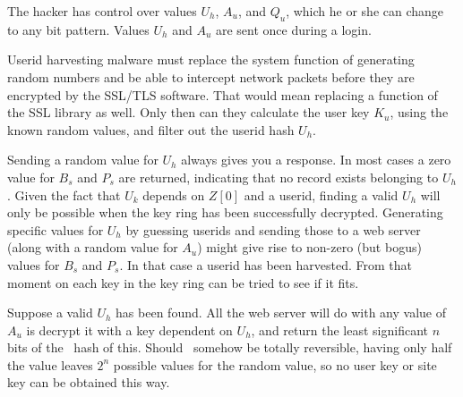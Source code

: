 \label{sec:manipulating_values}
The hacker has control over values $U_h$, $A_u$, and $Q_u$, which he or she can change to any bit pattern.
Values $U_h$ and $A_u$ are sent once during a login.
\par
Userid harvesting malware must replace the system function of generating random numbers
and be able to intercept network packets before they are encrypted by the SSL/TLS software.
That would mean replacing a function of the SSL library as well.
Only then can they calculate the user key $K_u$,
using the known random values,
and filter out the userid hash $U_h$.
\par
Sending a random value for $U_h$ always gives you a response.
In most cases a zero value for $B_s$ and $P_s$ are returned,
indicating that no record exists belonging to $U_h$.
Given the fact that $U_k$ depends on $Z[0]$ and a userid,
finding a valid $U_h$ will only be possible when the key ring
has been successfully decrypted.
Generating specific values for $U_h$ by guessing userids and sending those to a web server
(along with a random value for $A_u$)
might give rise to non-zero
(but bogus)
values for $B_s$ and $P_s$.
In that case a userid has been harvested.
From that moment on each key in the key ring can be tried to see if it fits.
\par
Suppose a valid $U_h$ has been found.
All the web server will do with any value of $A_u$ is decrypt it with a key dependent on $U_h$,
and return the least significant $n$ bits of the \SHA\ hash of this.
Should \SHA\ somehow be totally reversible,
having only half the value leaves $2^n$ possible values for the random value,
so no user key or site key can be obtained this way.
